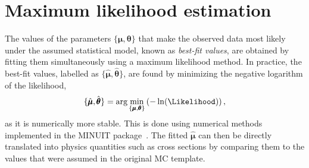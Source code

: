 
\section{Maximum likelihood estimation}
The values of the parameters $\{\pmb{\mu}, \pmb{\theta} \}$ that make the observed data most likely under the assumed statistical model, known as \emph{best-fit values}, are obtained by fitting them simultaneously using a maximum likelihood method.
In practice, the best-fit values, labelled as $\{\hat{\pmb{\mu}}, \hat{\pmb{\theta}} \}$, are found by minimizing the negative logarithm of the likelihood,
\begin{equation}
    \label{eq:best-fit-values}
    \{\hat{\pmb{\mu}}, \hat{\pmb{\theta}} \} = \text{arg} \min_{\{\pmb{\mu}, \pmb{\theta}\}} \left( - \ln (\Likelihood) \right),
\end{equation}
as it is numerically more stable. This is done using numerical methods implemented in the MINUIT package~\cite{James:1975dr}.
The fitted $\hat{\pmb{\mu}}$ can then be directly translated into physics quantities such as cross sections by comparing them to the values that were assumed in the original MC template.



